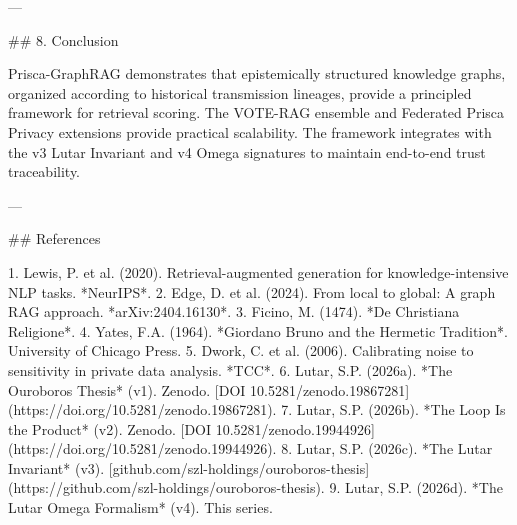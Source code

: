 ---

## 8. Conclusion

Prisca-GraphRAG demonstrates that epistemically structured knowledge graphs, organized according to historical transmission lineages, provide a principled framework for retrieval scoring. The VOTE-RAG ensemble and Federated Prisca Privacy extensions provide practical scalability. The framework integrates with the v3 Lutar Invariant and v4 Omega signatures to maintain end-to-end trust traceability.

---

## References

1. Lewis, P. et al. (2020). Retrieval-augmented generation for knowledge-intensive NLP tasks. *NeurIPS*.
2. Edge, D. et al. (2024). From local to global: A graph RAG approach. *arXiv:2404.16130*.
3. Ficino, M. (1474). *De Christiana Religione*.
4. Yates, F.A. (1964). *Giordano Bruno and the Hermetic Tradition*. University of Chicago Press.
5. Dwork, C. et al. (2006). Calibrating noise to sensitivity in private data analysis. *TCC*.
6. Lutar, S.P. (2026a). *The Ouroboros Thesis* (v1). Zenodo. [DOI 10.5281/zenodo.19867281](https://doi.org/10.5281/zenodo.19867281).
7. Lutar, S.P. (2026b). *The Loop Is the Product* (v2). Zenodo. [DOI 10.5281/zenodo.19944926](https://doi.org/10.5281/zenodo.19944926).
8. Lutar, S.P. (2026c). *The Lutar Invariant* (v3). [github.com/szl-holdings/ouroboros-thesis](https://github.com/szl-holdings/ouroboros-thesis).
9. Lutar, S.P. (2026d). *The Lutar Omega Formalism* (v4). This series.
